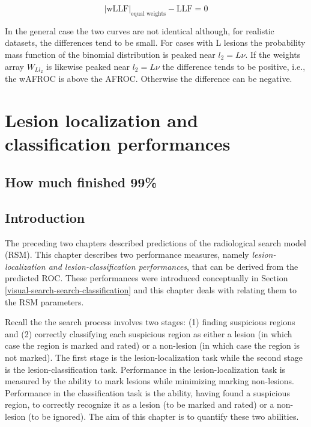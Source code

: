 \documentclass[
]{book}
\begin{document}
\begin{equation} 
\left| \text{wLLF} \right|_\text{equal weights} -\text{LLF} = 0
\label{eq:rsm-other-predictions-wllf-llf-eq-weights}
\end{equation}

In the general case the two curves are not identical although, for realistic datasets, the differences tend to be small. For cases with L lesions the probability mass function of the binomial distribution is peaked near \(l_2 =L\nu\). If the weights array \(W_{Ll_2}\) is likewise peaked near \(l_2 =L\nu\) the difference tends to be positive, i.e., the wAFROC is above the AFROC. Otherwise the difference can be negative.

\hypertarget{rsm-search-classification}{%
\chapter{Lesion localization and classification performances}\label{rsm-search-classification}}

\hypertarget{rsm-search-classification-how-much-finished}{%
\section{How much finished 99\%}\label{rsm-search-classification-how-much-finished}}

\hypertarget{rsm-search-classification-intro}{%
\section{Introduction}\label{rsm-search-classification-intro}}

The preceding two chapters described predictions of the radiological search model (RSM). This chapter describes two performance measures, namely \emph{lesion-localization and lesion-classification performances}, that can be derived from the predicted ROC. These performances were introduced conceptually in Section \ref{visual-search-search-classification} and this chapter deals with relating them to the RSM parameters.

Recall the the search process involves two stages: (1) finding suspicious regions and (2) correctly classifying each suspicious region as either a lesion (in which case the region is marked and rated) or a non-lesion (in which case the region is not marked). The first stage is the lesion-localization task while the second stage is the lesion-classification task. Performance in the lesion-localization task is measured by the ability to mark lesions while minimizing marking non-lesions. Performance in the classification task is the ability, having found a suspicious region, to correctly recognize it as a lesion (to be marked and rated) or a non-lesion (to be ignored). The aim of this chapter is to quantify these two abilities.
\end{document}
